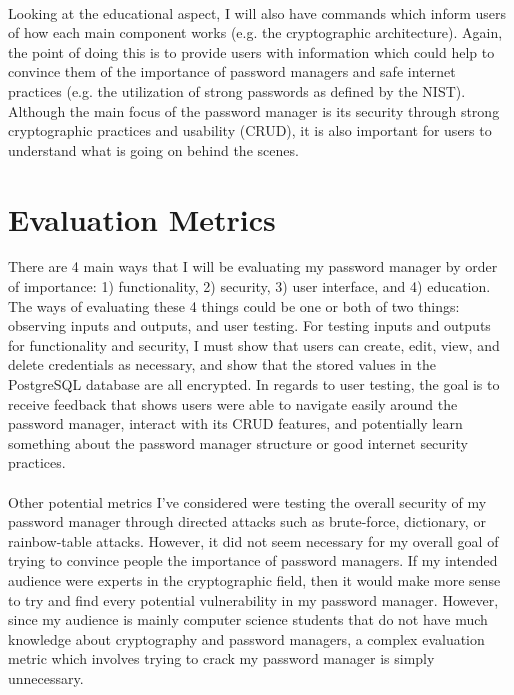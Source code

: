 \documentclass[10pt,twocolumn]{article}
\begin{document}
\paragraph{}
Looking at the educational aspect, I will also have commands which inform users of how each main component works (e.g. the cryptographic architecture). Again, the point of doing this is to provide users with information which could help to convince them of the importance of password managers and safe internet practices (e.g. the utilization of strong passwords as defined by the NIST). Although the main focus of the password manager is its security through strong cryptographic practices and usability (CRUD), it is also important for users to understand what is going on behind the scenes.


\section{Evaluation Metrics}


There are 4 main ways that I will be evaluating my password manager by order of importance: 1) functionality, 2) security, 3) user interface, and 4) education. The ways of evaluating these 4 things could be one or both of two things: observing inputs and outputs, and user testing. For testing inputs and outputs for functionality and security, I must show that users can create, edit, view, and delete credentials as necessary, and show that the stored values in the PostgreSQL database are all encrypted. In regards to user testing, the goal is to receive feedback that shows users were able to navigate easily around the password manager, interact with its CRUD features, and potentially learn something about the password manager structure or good internet security practices.
\paragraph{}
Other potential metrics I've considered were testing the overall security of my password manager through directed attacks such as brute-force, dictionary, or rainbow-table attacks\cite{Welekwe_2022}. However, it did not seem necessary for my overall goal of trying to convince people the importance of password managers. If my intended audience were experts in the cryptographic field, then it would make more sense to try and find every potential vulnerability in my password manager. However, since my audience is mainly computer science students that do not have much knowledge about cryptography and password managers, a complex evaluation metric which involves trying to crack my password manager is simply unnecessary.
\end{document}
